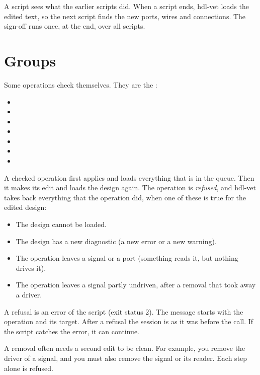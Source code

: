 A script sees what the earlier scripts did. When a script ends, hdl-vet loads the
edited text, so the next script finds the new ports, wires and connections. The
sign-off runs once, at the end, over all scripts.

\section{Groups}

Some operations check themselves. They are the :

\begin{itemize}
\item {}
\item {}
\item {}
\item {}
\item {}
\item {}
\item {}
\end{itemize}

A checked operation first applies and loads everything that is in the queue.
Then it makes its edit and loads the design again. The operation is
\emph{refused}, and hdl-vet takes back everything that the operation did, when one
of these is true for the edited design:

\begin{itemize}
\item The design cannot be loaded.
\item The design has a new diagnostic (a new error or a new warning).
\item The operation leaves a signal or a port  (something reads it,
  but nothing drives it).
\item The operation leaves a signal partly undriven, after a removal that took away a
  driver.
\end{itemize}

A refusal is an error of the script (exit status 2). The message starts with the
operation and its target. After a refusal the session is as it was before the
call. If the script catches the error, it can continue.

A removal often needs a second edit to be clean. For example, you remove the driver of a
signal, and you must also remove the signal or its reader. Each step alone is
refused.

